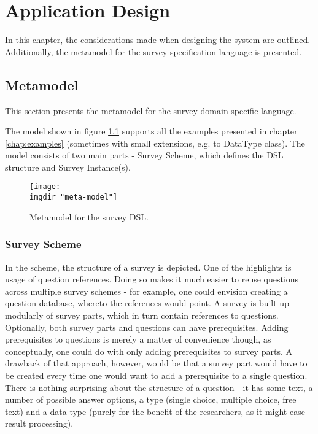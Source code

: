 \chapter{Application Design}
\label{chap:design}
In this chapter, the considerations made when designing the system are outlined. Additionally, the metamodel for the survey specification language is presented.

\section{Metamodel}
\label{sec:metamodel}
This section presents the metamodel for the survey domain specific language.  

The model shown in figure \ref{fig:metamodel} supports all the examples presented in chapter \ref{chap:examples} (sometimes with small extensions, e.g. to DataType class).
The model consists of two main parts - Survey Scheme, which defines the DSL structure and Survey Instance(s).

\begin{figure}[!ht]
  \texttt{[image: \\imgdir "meta-model"]}
  \caption{Metamodel for the survey DSL.}
  \label{fig:metamodel}
\end{figure}

\subsection{Survey Scheme}
\label{subsec:surveyscheme}
In the scheme, the structure of a survey is depicted. One of the highlights is usage of question references. Doing so makes it much easier to reuse questions across multiple survey schemes - for example, one could envision creating a question database, whereto the references would point.
A survey is built up modularly of survey parts, which in turn contain references to questions. Optionally, both survey parts and questions can have prerequisites. Adding prerequisites to questions is merely a matter of convenience though, as conceptually, one could do with only adding prerequisites to survey parts. A drawback of that approach, however, would be that a survey part would have to be created every time one would want to add a prerequisite to a single question.
There is nothing surprising about the structure of a question - it has some text, a number of possible answer options, a type (single choice, multiple choice, free text) and a data type (purely for the benefit of the researchers, as it might ease result processing).

